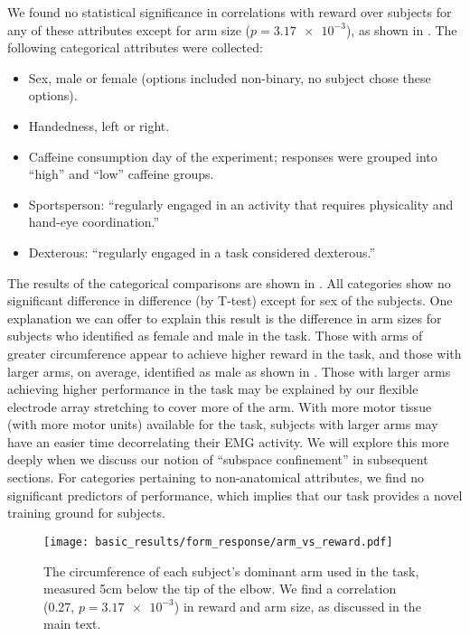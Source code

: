 \documentclass[../main.tex]{subfiles}
\begin{document}
We found no statistical significance in correlations with reward over subjects for any of these attributes except for arm size ($p=\num{3.17e-3}$), as shown in . The following categorical attributes were collected:

\begin{itemize}
    \item Sex, male or female (options included non-binary, no subject chose these options). %
    \item Handedness, left or right. %
    \item Caffeine consumption day of the experiment; responses were grouped into ``high'' and ``low'' caffeine groups. %
    \item Sportsperson: ``regularly engaged in an activity that requires physicality and hand-eye coordination.'' %
    \item Dexterous: ``regularly engaged in a task considered dexterous.'' %
\end{itemize}

The results of the categorical comparisons are shown in . All categories show no significant difference in difference (by T-test) except for sex of the subjects. One explanation we can offer to explain this result is the difference in arm sizes for subjects who identified as female and male in the task. Those with arms of greater circumference appear to achieve higher reward in the task, and those with larger arms, on average, identified as male as shown in . Those with larger arms achieving higher performance in the task may be explained by our flexible electrode array stretching to cover more of the arm. With more motor tissue (with more motor units) available for the task, subjects with larger arms may have an easier time decorrelating their EMG activity. We will explore this more deeply when we discuss our notion of ``subspace confinement'' in subsequent sections. For categories pertaining to non-anatomical attributes, we find no significant predictors of performance, which implies that our task provides a novel training ground for subjects.

\begin{figure}[!htb]%
    \centering
    \texttt{[image: basic\_results/form\_response/arm\_vs\_reward.pdf]}
    \caption[Arm versus reward]{The circumference of each subject's dominant arm used in the task, measured 5cm below the tip of the elbow. We find a correlation (0.27, $p=\num{3.17e-3}$) in reward and arm size, as discussed in the main text.}\label{fig:arm_vs_reward}
\end{figure}
\end{document}
